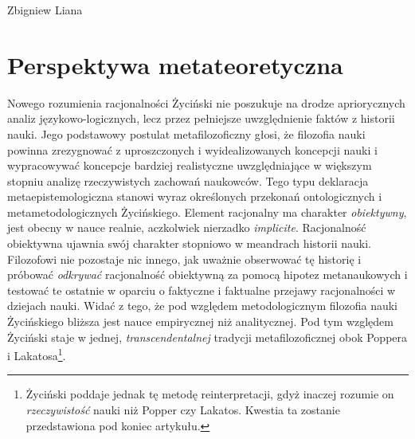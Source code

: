 \begin{artplenv}{Zbigniew Liana}
\section{Perspektywa metateoretyczna}

Nowego rozumienia racjonalności Życiński nie poszukuje na drodze apriorycznych analiz językowo-logicznych, lecz przez
pełniejsze uwzględnienie faktów z historii nauki. Jego podstawowy postulat metafilozoficzny głosi, że filozofia nauki
powinna zrezygnować z uproszczonych i wyidealizowanych koncepcji nauki i wypracowywać koncepcje bardziej realistyczne
uwzględniające w większym stopniu analizę rzeczywistych zachowań naukowców. Tego typu deklaracja metaepistemologiczna
stanowi wyraz określonych przekonań ontologicznych i metametodologicznych Życińskiego. Element racjonalny ma charakter
\textit{obiektywny}, jest obecny w nauce realnie, aczkolwiek nierzadko \textit{implicite}. Racjonalność obiektywna ujawnia
swój charakter stopniowo w meandrach historii nauki. Filozofowi nie pozostaje nic innego, jak uważnie obserwować tę
historię i próbować \textit{odkrywać }racjonalność obiektywną za pomocą hipotez metanaukowych i testować te ostatnie w
oparciu o faktyczne i faktualne przejawy racjonalności w dziejach nauki. Widać z tego, że pod względem metodologicznym
filozofia nauki Życińskiego bliższa jest nauce empirycznej niż analitycznej. Pod tym względem Życiński staje w jednej,
\textit{transcendentalnej} tradycji metafilozoficznej obok Poppera i Lakatosa\footnote{Życiński poddaje jednak tę metodę
	reinterpretacji, gdyż inaczej rozumie on \textit{rzeczywistość} nauki niż Popper czy Lakatos. Kwestia ta zostanie
	przedstawiona pod koniec artykułu.}.


\end{artplenv}
